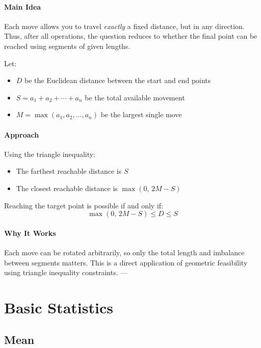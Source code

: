 \documentclass[11pt]{article}
\begin{document}
\paragraph{Main Idea}

Each move allows you to travel \emph{exactly} a fixed distance, but in any direction.
Thus, after all operations, the question reduces to whether the final point can be
reached using segments of given lengths.

Let:
\begin{itemize}
    \item $D$ be the Euclidean distance between the start and end points
    \item $S = a_1 + a_2 + \cdots + a_n$ be the total available movement
    \item $M = \max(a_1, a_2, \ldots, a_n)$ be the largest single move
\end{itemize}

\paragraph{Approach}

Using the triangle inequality:
\begin{itemize}
    \item The farthest reachable distance is $S$
    \item The closest reachable distance is $\max(0,\, 2M - S)$
\end{itemize}

Reaching the target point is possible if and only if:
\[
\max(0,\, 2M - S) \le D \le S
\]

\paragraph{Why It Works}

Each move can be rotated arbitrarily, so only the total length and imbalance between
segments matters. This is a direct application of geometric feasibility using
triangle inequality constraints.
---

\section{Basic Statistics}

\subsection{Mean}
\end{document}
